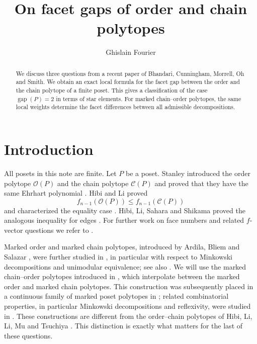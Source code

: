 \documentclass[a4paper, 11pt]{amsart}
\title{On facet gaps of order and chain polytopes}
\author{Ghislain Fourier}
\theoremstyle{definition}
\theoremstyle{remark}
\newcommand{\cO}{\mathcal O}
\newcommand{\cC}{\mathcal C}
\newcommand{\gap}{\operatorname{gap}}
\begin{document}
\begin{abstract}

We discuss three questions from a recent paper of Bhandari, Cunningham,
Morrell, Oh and Smith. We obtain an exact local formula for the facet gap
between the order and the chain polytope of a finite poset. This gives a
classification of the case $\gap(P)=2$ in terms of star elements. For
marked chain--order polytopes, the same local weights determine the facet
differences between all admissible decompositions.
\end{abstract}


\maketitle

\section{Introduction}

All posets in this note are finite. Let $P$ be a poset. Stanley introduced the order polytope $\cO(P)$ and the chain polytope $\cC(P)$ and proved that they have the same Ehrhart polynomial \cite{Stanley1986}. Hibi and Li proved
\[
  f_{n-1}(\cO(P))\leq f_{n-1}(\cC(P))
\]
and characterized the equality case \cite{HibiLi2016}. Hibi, Li, Sahara and Shikama proved the analogous inequality for edges \cite{HibiLiSaharaShikama2017}. For further work on face numbers and related $f$-vector questions we refer to \cite{FreijHollantiLundstrom2024,
AhmadFourierJoswig2026,
Mori2025,
FreijHollantiLundstromMori2026,
FreijHollantiLundstrom2025}.

Marked order and marked chain polytopes, introduced by Ardila, Bliem and Salazar \cite{ArdilaBliemSalazar2011}, were further studied in \cite{Fourier2016}, in particular with respect to Minkowski decompositions and unimodular equivalence; see also \cite{JochemkoSanyal2014,Pegel2018}. We will use the marked chain--order polytopes introduced in \cite{FangFourier2016}, which interpolate between the marked order and marked chain polytopes. This construction was subsequently placed in a continuous family of marked poset polytopes in \cite{FangFourierLitzaPegel2020}; related combinatorial properties, in particular Minkowski decompositions and reflexivity, were studied in \cite{FangFourierPegel2020}. These constructions are different from the order--chain polytopes of Hibi, Li, Li, Mu and Tsuchiya \cite{HibiEtAl2019}. This distinction is exactly what matters for the last of these questions.
\end{document}
